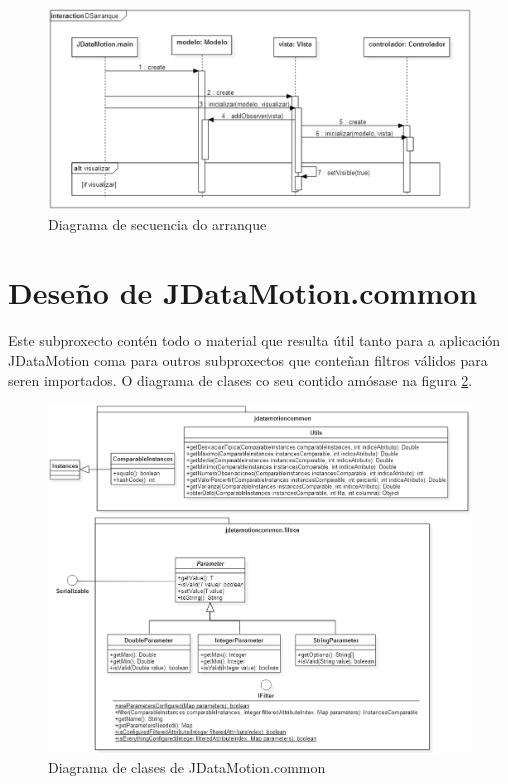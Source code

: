 \begin{figure}
\centering
\includegraphics[width=\textwidth,height=\textheight,keepaspectratio]{figuras/DSarranque}
\caption{Diagrama de secuencia do arranque}
\label{DSarranque}
\end{figure}

\section{Deseño de JDataMotion.common}

Este subproxecto contén todo o material que resulta útil tanto para a aplicación JDataMotion coma para outros subproxectos que conteñan filtros válidos para seren importados. O diagrama de clases co seu contido amósase na figura \ref{JDataMotioncommon}.

\begin{figure}
\centering
\includegraphics[width=\textwidth,height=\textheight,keepaspectratio]{figuras/JDataMotioncommon}
\caption{Diagrama de clases de JDataMotion.common}
\label{JDataMotioncommon}
\end{figure}

